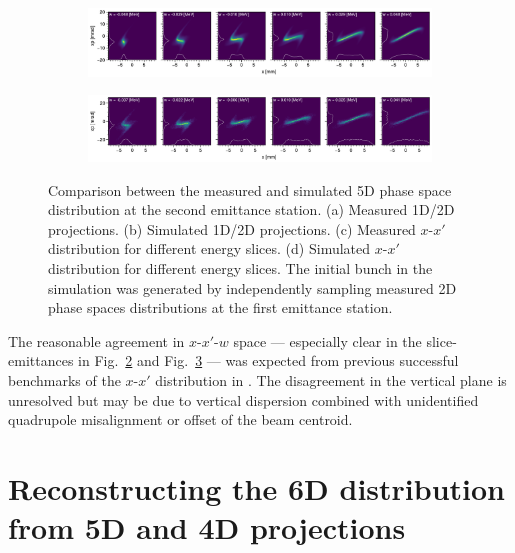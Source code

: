 \documentclass[letterpaper,
               keeplastbox,
               nospread,
               biblatex,
              ]{jacow}
\begin{document}
\begin{figure}[!t]
\begin{subfigure}{0.48\textwidth}
        \caption{}
        \label{fig:VS34_b}
    \end{subfigure}
    \vfill
    \vspace*{0.2cm}
    \vfill
    \begin{subfigure}{\textwidth}
        \includegraphics[width=\textwidth]{VS34_energy_slice.pdf}
        \caption{}
        \label{fig:VS34_c}
    \end{subfigure}
    \vfill
    \vspace*{0.2cm}
    \vfill
    \begin{subfigure}{\textwidth}
        \includegraphics[width=\textwidth]{VS34_energy_slice_sim.png}
        \caption{}
        \label{fig:VS34_d}
    \end{subfigure}
    \caption{Comparison between the measured and simulated 5D phase space distribution at the second emittance station. (a) Measured 1D/2D projections. (b) Simulated 1D/2D projections. (c) Measured $x$-$x'$ distribution for different energy slices. (d) Simulated $x$-$x'$ distribution for different energy slices. The initial bunch in the simulation was generated by independently sampling measured 2D phase spaces distributions at the first emittance station.}
    \label{fig:VS34}
\end{figure}
%

The reasonable agreement in $x$-$x'$-$w$ space — especially clear in the slice-emittances in Fig.~\ref{fig:VS34_c} and Fig.~\ref{fig:VS34_d} — was expected from previous successful benchmarks of the $x$-$x'$ distribution in \cite{Ruisard2021-IPAC}. The disagreement in the vertical plane is unresolved but may be due to vertical dispersion combined with unidentified quadrupole misalignment or offset of the beam centroid.


\section{Reconstructing the 6D distribution from 5D and 4D projections} 
\end{document}

